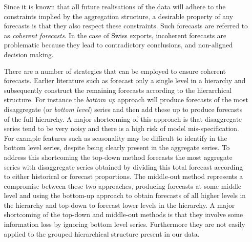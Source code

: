 \documentclass[a4paper,fleqn,11pt]{article}
\begin{document}

Since it is known that all future realisations of the data will adhere to the constraints implied by the aggregation structure, a desirable property of any forecasts is that they also respect these constraints.  Such forecasts are referred to as {\em coherent forecasts}.  In the case of Swiss exports, incoherent forecasts are problematic because they lead to contradictory conclusions, and non-aligned decision making.  

There are a number of strategies that can be employed to ensure coherent forecasts.  Earlier literature such as \cite{Gross1990} forecast only a single level in a hierarchy and subsequently construct the remaining forecasts according to the hierarchical structure.  For instance the {\em bottom up} approach will produce forecasts of the most disaggregate (or {\em bottom level}) series and then add these up to produce forecasts of the full hierarchy.  A major shortcoming of this approach is that disaggregate series tend to be very noisy and there is a high risk of model mis-specification.  For example features such as seasonality may be difficult to identify in the bottom level series, despite being clearly present in the aggregate series.  To address this shortcoming the top-down method forecasts the most aggregate series with disaggregate series obtained by dividing this total forecast according to either historical or forecast proportions.  The middle-out method represents a compromise between these two approaches, producing forecasts at some middle level and using the bottom-up approach to obtain forecasts of all higher levels in the hierarchy and top-down to forecast lower levels in the hierarchy.  A major shortcoming of the top-down and middle-out methods is that they involve some information loss by ignoring bottom level series.  Furthermore they are not easily applied to the grouped hierarchical structure present in our data.
\end{document}
